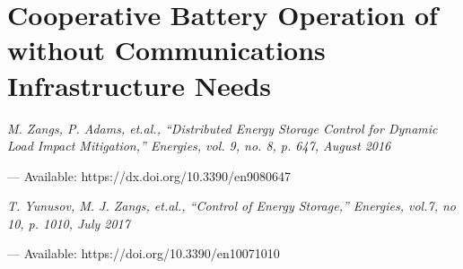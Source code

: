 \chapter{Cooperative Battery Operation of without Communications Infrastructure Needs}
\label{ch4}

\singlespacing
\epigraph{\textit{M. Zangs, P. Adams, et.al., ``Distributed Energy Storage Control for Dynamic Load Impact Mitigation,'' Energies, vol. 9, no. 8, p. 647, August 2016}}{--- Available: https://dx.doi.org/10.3390/en9080647}
\epigraph{\textit{T. Yunusov, M. J. Zangs, et.al., ``Control of Energy Storage,'' Energies, vol.7, no 10, p. 1010, July 2017}}{--- Available: https://doi.org/10.3390/en10071010}
\doublespacing



